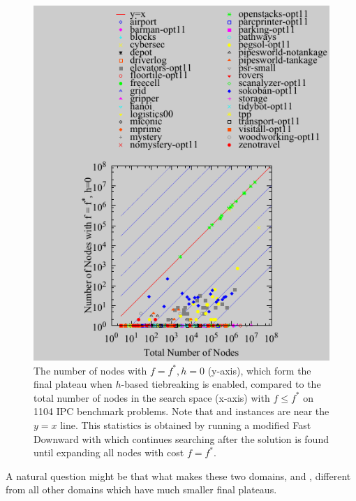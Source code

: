 \begin{figure}[htbp]
   \centering
  \includegraphics{tables/aaai16-frontier/aaai16prelim3/lmcut_frontier-front.pdf}
  \caption{
 The number of nodes with $f=f^*, h=0$ (y-axis), which form
  the final plateau when $h$-based tiebreaking is enabled, compared to
  the total number of nodes in the search space (x-axis) with $f\leq
  f^*$ on 1104 IPC benchmark problems.  Note that 
  and  instances are near the $y=x$ line.
  This statistics is obtained by running a modified Fast Downward with
 \lmcut which continues searching after the solution is found
 until expanding all nodes with cost $f=f^*$.} \label{fig:plateau}
\end{figure}


A natural question might be that what makes these two domains,
 and , different from all other domains
which have much smaller final plateaus.
